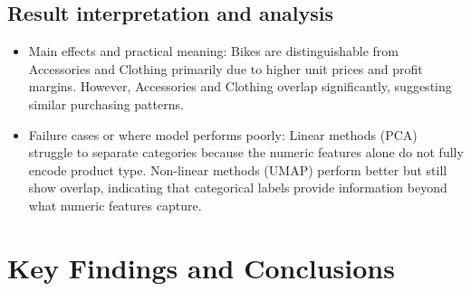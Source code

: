 \documentclass[11pt]{article}
\begin{document}
\subsection{Result interpretation and analysis}
\begin{itemize}[leftmargin=*]
    \item Main effects and practical meaning: Bikes are distinguishable from Accessories 
    and Clothing primarily due to higher unit prices and profit margins. However, 
    Accessories and Clothing overlap significantly, suggesting similar purchasing patterns.
    \item Failure cases or where model performs poorly: Linear methods (PCA) struggle to 
    separate categories because the numeric features alone do not fully encode product type. 
    Non-linear methods (UMAP) perform better but still show overlap, indicating that 
    categorical labels provide information beyond what numeric features capture.
\end{itemize}











\section{Key Findings and Conclusions}
\end{document}
